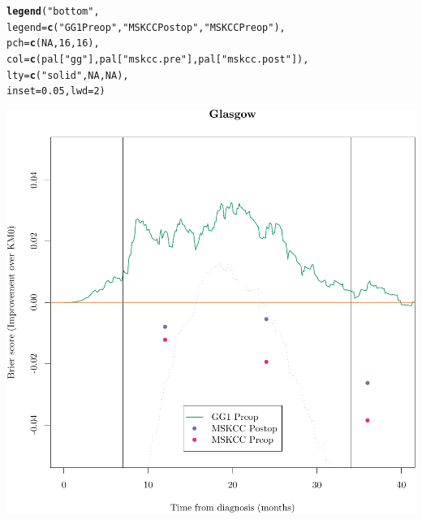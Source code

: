 \documentclass{article}\usepackage[]{graphicx}\usepackage[]{color}
\makeatletter
\def\maxwidth{ %
  \ifdim\Gin@nat@width>\linewidth
    \linewidth
  \else
    \Gin@nat@width
  \fi
}
\newcommand{\hlnum}[1]{\textcolor[rgb]{0.686,0.059,0.569}{#1}}%
\newcommand{\hlstr}[1]{\textcolor[rgb]{0.192,0.494,0.8}{#1}}%
\newcommand{\hlstd}[1]{\textcolor[rgb]{0.345,0.345,0.345}{#1}}%
\newcommand{\hlkwc}[1]{\textcolor[rgb]{0.333,0.667,0.333}{#1}}%
\newcommand{\hlkwd}[1]{\textcolor[rgb]{0.737,0.353,0.396}{\textbf{#1}}}%
\newenvironment{kframe}{%
 \def\at@end@of@kframe{}%
 \ifinner\ifhmode%
  \def\at@end@of@kframe{\end{minipage}}%
  \begin{minipage}{\columnwidth}%
 \fi\fi%
 \def\FrameCommand##1{\hskip\@totalleftmargin \hskip-\fboxsep
 \colorbox{shadecolor}{##1}\hskip-\fboxsep
     \hskip-\linewidth \hskip-\@totalleftmargin \hskip\columnwidth}%
 \MakeFramed {\advance\hsize-\width
   \@totalleftmargin\z@ \linewidth\hsize
   \@setminipage}}%
 {\par\unskip\endMakeFramed%
 \at@end@of@kframe}
\newenvironment{knitrout}{}{} %
\makeatother
\begin{document}
\begin{knitrout}
\begin{kframe}
\begin{alltt}
\hlkwd{legend}\hlstd{(}\hlstr{"bottom"}\hlstd{,}
        \hlkwc{legend} \hlstd{=} \hlkwd{c}\hlstd{(}     \hlstr{"GG1 Preop"}\hlstd{,}    \hlstr{"MSKCC Postop"}\hlstd{,}         \hlstr{"MSKCC Preop"}\hlstd{),}
        \hlkwc{pch} \hlstd{=} \hlkwd{c}\hlstd{(}        \hlnum{NA}\hlstd{,}                     \hlnum{16}\hlstd{,}                             \hlnum{16}\hlstd{),}
        \hlkwc{col} \hlstd{=} \hlkwd{c}\hlstd{(        pal[}\hlstr{"gg"}\hlstd{],              pal[}\hlstr{"mskcc.pre"}\hlstd{],       pal[}\hlstr{"mskcc.post"}\hlstd{]),}
        \hlkwc{lty} \hlstd{=} \hlkwd{c}\hlstd{(}        \hlstr{"solid"}\hlstd{,}                \hlnum{NA}\hlstd{,}                             \hlnum{NA}\hlstd{),}
        \hlkwc{inset} \hlstd{=} \hlnum{0.05}\hlstd{,} \hlkwc{lwd} \hlstd{=} \hlnum{2}\hlstd{)}
\end{alltt}
\end{kframe}

{\centering \includegraphics[width=\maxwidth]{figure/07-prob-bs-paths-plot-glasgow-4} 

}



\end{knitrout}
\end{document}
